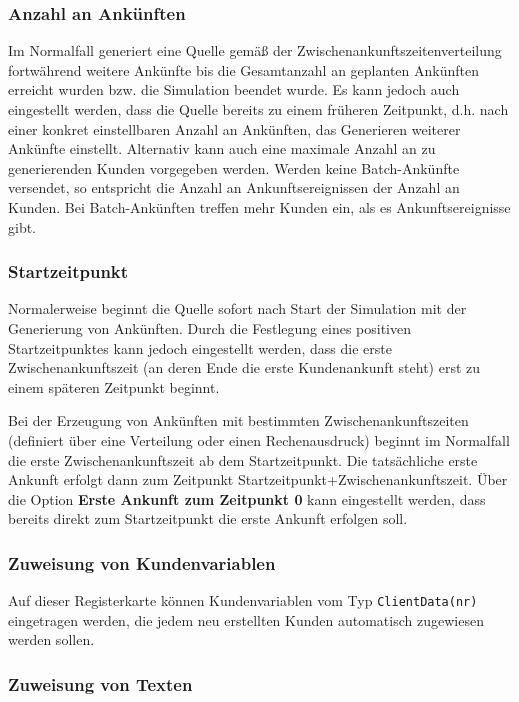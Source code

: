 \subsubsection*{Anzahl an Ankünften}

Im Normalfall generiert eine Quelle gemäß der Zwischenankunftszeitenverteilung fortwährend
weitere Ankünfte bis die Gesamtanzahl an geplanten Ankünften erreicht wurden bzw. die Simulation beendet wurde.
Es kann jedoch auch eingestellt werden, dass die Quelle bereits zu einem früheren Zeitpunkt,
d.h. nach einer konkret einstellbaren Anzahl an Ankünften, das Generieren weiterer Ankünfte einstellt.
Alternativ kann auch eine maximale Anzahl an zu generierenden Kunden vorgegeben werden.
Werden keine Batch-Ankünfte versendet, so entspricht die Anzahl an Ankunftsereignissen der
Anzahl an Kunden. Bei Batch-Ankünften treffen mehr Kunden ein, als es Ankunftsereignisse gibt.

\subsubsection*{Startzeitpunkt}

Normalerweise beginnt die Quelle sofort nach Start der Simulation mit der Generierung von
Ankünften. Durch die Festlegung eines positiven Startzeitpunktes kann jedoch eingestellt
werden, dass die erste Zwischenankunftszeit (an deren Ende die erste Kundenankunft steht) erst
zu einem späteren Zeitpunkt beginnt.

Bei der Erzeugung von Ankünften mit bestimmten Zwischenankunftszeiten (definiert über eine Verteilung
oder einen Rechenausdruck) beginnt im Normalfall die erste Zwischenankunftszeit ab dem Startzeitpunkt.
Die tatsächliche erste Ankunft erfolgt dann zum Zeitpunkt Startzeitpunkt+Zwischenankunftszeit. Über
die Option \textbf{Erste Ankunft zum Zeitpunkt 0} kann eingestellt werden, dass bereits direkt zum
Startzeitpunkt die erste Ankunft erfolgen soll.

\subsubsection*{Zuweisung von Kundenvariablen}

Auf dieser Registerkarte können Kundenvariablen vom Typ \texttt{ClientData(nr)} eingetragen werden,
die jedem neu erstellten Kunden automatisch zugewiesen werden sollen.

\subsubsection*{Zuweisung von Texten}

